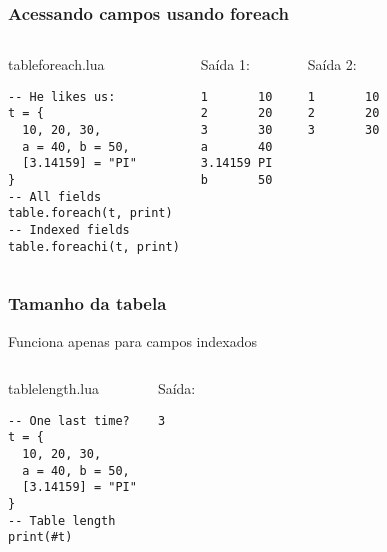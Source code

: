 \documentclass[brazil]{beamer}
\begin{document}
\begin{frame}[fragile]
  \frametitle{Acessando campos usando foreach}
  \pause
  \begin{columns}
      \begin{block}{tableforeach.lua}
        \begin{lstlisting}
-- He likes us:
t = {
  10, 20, 30,
  a = 40, b = 50,
  [3.14159] = "PI"
}
-- All fields
table.foreach(t, print)
-- Indexed fields
table.foreachi(t, print)
        \end{lstlisting}
      \end{block}
    \pause
      \begin{block}{Saída 1:}
        \begin{verbatim}
1       10
2       20
3       30
a       40
3.14159 PI
b       50  \end{verbatim}
      \end{block}
      \pause
      \begin{block}{Saída 2:}
        \begin{verbatim}
1       10
2       20
3       30 \end{verbatim}
      \end{block}
  \end{columns}
\end{frame}
\begin{frame}[fragile]
  \frametitle{Tamanho da tabela}
  \pause
  \begin{center}
    Funciona apenas para campos indexados
  \end{center}
  \pause
  \begin{columns}
      \begin{block}{tablelength.lua}
        \begin{lstlisting}
-- One last time?
t = {
  10, 20, 30,
  a = 40, b = 50,
  [3.14159] = "PI"
}
-- Table length
print(#t)
        \end{lstlisting}
      \end{block}
    \pause
      \begin{block}{Saída:}
        \begin{verbatim}
3 \end{verbatim}
      \end{block}
  \end{columns}
\end{frame}
\end{document}

